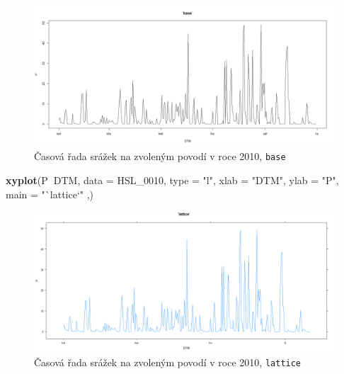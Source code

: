 \documentclass[12pt,]{article}
\newenvironment{Shaded}{\begin{snugshade}}{\end{snugshade}}
\newcommand{\KeywordTok}[1]{\textcolor[rgb]{0.13,0.29,0.53}{\textbf{#1}}}
\newcommand{\DataTypeTok}[1]{\textcolor[rgb]{0.13,0.29,0.53}{#1}}
\newcommand{\DecValTok}[1]{\textcolor[rgb]{0.00,0.00,0.81}{#1}}
\newcommand{\StringTok}[1]{\textcolor[rgb]{0.31,0.60,0.02}{#1}}
\newcommand{\OperatorTok}[1]{\textcolor[rgb]{0.81,0.36,0.00}{\textbf{#1}}}
\newcommand{\NormalTok}[1]{#1}
\begin{document}
\begin{Shaded}
\end{Shaded}

\begin{figure}[H]
      \includegraphics[width=\textwidth]{fig/1base}
      \caption{Časová řada srážek na zvoleným povodí v roce 2010, \texttt{base}}
      \label{fig1a}
\end{figure}

\newpage

\begin{Shaded}
\begin{Highlighting}[]
\KeywordTok{xyplot}\NormalTok{(P}\OperatorTok{~}\NormalTok{DTM, }\DataTypeTok{data =}\NormalTok{ HSL_}\DecValTok{0010}\NormalTok{, }\DataTypeTok{type =} \StringTok{"l"}\NormalTok{, }
                               \DataTypeTok{xlab =} \StringTok{"DTM"}\NormalTok{, }\DataTypeTok{ylab =} \StringTok{"P"}\NormalTok{, }
                               \DataTypeTok{main =} \StringTok{"`lattice`"}\NormalTok{ ,)}
\end{Highlighting}
\end{Shaded}

\begin{figure}[H]
      \includegraphics[width=\textwidth]{fig/2lattice}
      \caption{Časová řada srážek na zvoleným povodí v roce 2010, \texttt{lattice}}
      \label{fig1b}
\end{figure}
\end{document}

